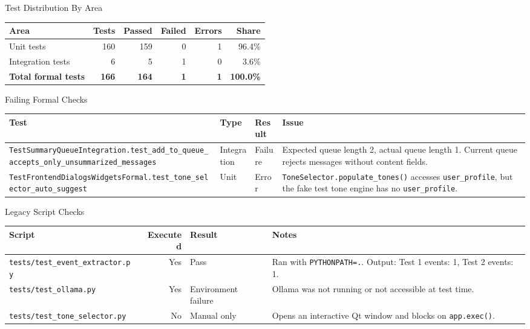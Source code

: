 \begin{frame}{Test Distribution By Area}
\small
\begin{tabular}{lrrrrr}
\hline
\textbf{Area} & \textbf{Tests} & \textbf{Passed} & \textbf{Failed} & \textbf{Errors} & \textbf{Share}\\
\hline
Unit tests & 160 & 159 & 0 & 1 & 96.4\%\\
Integration tests & 6 & 5 & 1 & 0 & 3.6\%\\
\hline
\textbf{Total formal tests} & \textbf{166} & \textbf{164} & \textbf{1} & \textbf{1} & \textbf{100.0\%}\\
\hline
\end{tabular}
\end{frame}

\begin{frame}{Failing Formal Checks}
\scriptsize
\begin{tabular}{p{}p{}p{}p{}}
\hline
\textbf{Test} & \textbf{Type} & \textbf{Result} & \textbf{Issue}\\
\hline
\texttt{TestSummaryQueueIntegration.test\_add\_to\_queue\_accepts\_only\_unsummarized\_messages}
& Integration & Failure
& Expected queue length 2, actual queue length 1. Current queue rejects messages without content fields.\\
\hline
\texttt{TestFrontendDialogsWidgetsFormal.test\_tone\_selector\_auto\_suggest}
& Unit & Error
& \texttt{ToneSelector.populate\_tones()} accesses \texttt{user\_profile}, but the fake test tone engine has no \texttt{user\_profile}.\\
\hline
\end{tabular}
\end{frame}

\begin{frame}{Legacy Script Checks}
\scriptsize
\begin{tabular}{p{}r p{} p{}}
\hline
\textbf{Script} & \textbf{Executed} & \textbf{Result} & \textbf{Notes}\\
\hline
\texttt{tests/test\_event\_extractor.py} & Yes & Pass & Ran with \texttt{PYTHONPATH=.}. Output: Test 1 events: 1, Test 2 events: 1.\\
\texttt{tests/test\_ollama.py} & Yes & Environment failure & Ollama was not running or not accessible at test time.\\
\texttt{tests/test\_tone\_selector.py} & No & Manual only & Opens an interactive Qt window and blocks on \texttt{app.exec()}.\\
\hline
\end{tabular}
\end{frame}

